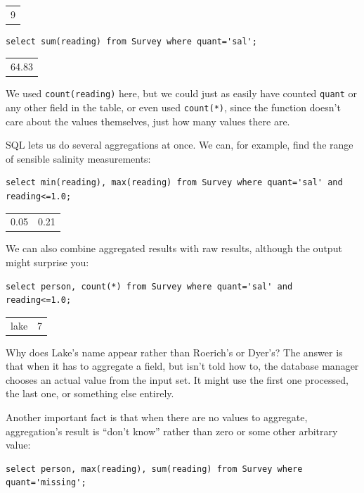 \documentclass{book}
\begin{document}
\begin{tabular}{l}
9 \\
\end{tabular}

\begin{verbatim}
select sum(reading) from Survey where quant='sal';
\end{verbatim}

\begin{tabular}{l}
64.83 \\
\end{tabular}

We used \texttt{count(reading)} here, but we could just as easily have
counted \texttt{quant} or any other field in the table, or even used
\texttt{count(*)}, since the function doesn't care about the values
themselves, just how many values there are.

SQL lets us do several aggregations at once. We can, for example, find
the range of sensible salinity measurements:

\begin{verbatim}
select min(reading), max(reading) from Survey where quant='sal' and reading<=1.0;
\end{verbatim}

\begin{tabular}{ll}
0.05 & 0.21 \\
\end{tabular}

We can also combine aggregated results with raw results, although the
output might surprise you:

\begin{verbatim}
select person, count(*) from Survey where quant='sal' and reading<=1.0;
\end{verbatim}

\begin{tabular}{ll}
lake & 7 \\
\end{tabular}

Why does Lake's name appear rather than Roerich's or Dyer's? The answer
is that when it has to aggregate a field, but isn't told how to, the
database manager chooses an actual value from the input set. It might
use the first one processed, the last one, or something else entirely.

Another important fact is that when there are no values to aggregate,
aggregation's result is ``don't know'' rather than zero or some other
arbitrary value:

\begin{verbatim}
select person, max(reading), sum(reading) from Survey where quant='missing';
\end{verbatim}
\end{document}

